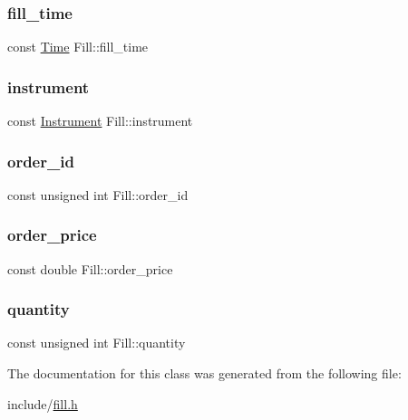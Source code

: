 \mbox{\label{classFill_a3c16af5c63d428b20e145bdd8aed079c}} 
\subsubsection{\texorpdfstring{fill\+\_\+time}{fill\_time}}
{\footnotesize\ttfamily const \hyperlink{classFill_ab2f91079415160baf6bae4ce4e651882}{Time} Fill\+::fill\+\_\+time}

\mbox{\label{classFill_ad8cc2217100d31b29c61554adfae4c89}} 
\subsubsection{\texorpdfstring{instrument}{instrument}}
{\footnotesize\ttfamily const \hyperlink{classInstrument}{Instrument} Fill\+::instrument}

\mbox{\label{classFill_afd7bfe98f2df0ae03a662083b0526ad1}} 
\subsubsection{\texorpdfstring{order\+\_\+id}{order\_id}}
{\footnotesize\ttfamily const unsigned int Fill\+::order\+\_\+id}

\mbox{\label{classFill_ac7415e2ba0339c0060d13b4900971f25}} 
\subsubsection{\texorpdfstring{order\+\_\+price}{order\_price}}
{\footnotesize\ttfamily const double Fill\+::order\+\_\+price}

\mbox{\label{classFill_a6a19e54b16e7025f2196e6658acf8976}} 
\subsubsection{\texorpdfstring{quantity}{quantity}}
{\footnotesize\ttfamily const unsigned int Fill\+::quantity}



The documentation for this class was generated from the following file\+:\begin{DoxyCompactItemize}
\item 
include/\hyperlink{fill_8h}{fill.\+h}\end{DoxyCompactItemize}
